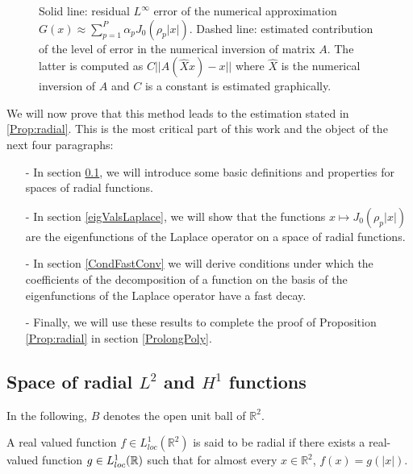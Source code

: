 \documentclass[11pt,a4paper]{article}
\begin{document}
\begin{figure}[H]
\centering 

\caption{Solid line: residual $L^{\infty}$ error of the numerical approximation $G(x) \approx \sum_{p=1}^P\alpha_p J_0(\rho_p |x|)$. Dashed line: estimated contribution of the level of error in the numerical inversion of matrix $A$. The latter is computed as $C ||A (\hat{X}x) - x||$ where $\hat{X}$ is the numerical inversion of $A$ and $C$ is a constant is estimated graphically.}
\label{emina}
\end{figure}

We will now prove that this method leads to the estimation stated in \ref{Prop:radial}. This is the most critical part of this work and the object of the next four paragraphs: 
\begin{itemize}
\item[-] In  section \ref{radialSpace}, we will introduce some basic definitions and properties for spaces of radial functions. 
\item[-] In section \ref{eigValsLaplace}, we will show that the functions $x \mapsto J_0(\rho_p|x|)$ are the eigenfunctions of the Laplace operator on a space of radial functions. 
\item[-] In section \ref{CondFastConv} we will derive conditions under which the coefficients of the decomposition of a function on the basis of the eigenfunctions of the Laplace operator have a fast decay.
\item[-] Finally, we will use these results to complete the proof of Proposition \ref{Prop:radial} in section \ref{ProlongPoly}.
\end{itemize}

\subsection{Space of radial $L^2$ and $H^1$ functions}
\label{radialSpace}
In the following, $B$ denotes the open unit ball of $\mathbb{R}^2$. 

\begin{Def} A real valued function $f \in L^1_{loc}(\mathbb{R}^2)$ is said to be radial if there exists a real-valued function $g \in L^1_{loc}(\mathbb{R})$ such that for almost every $x\in \mathbb{R}^2$, $f(x) = g(|x|)$.  
\end{Def}
\end{document}
